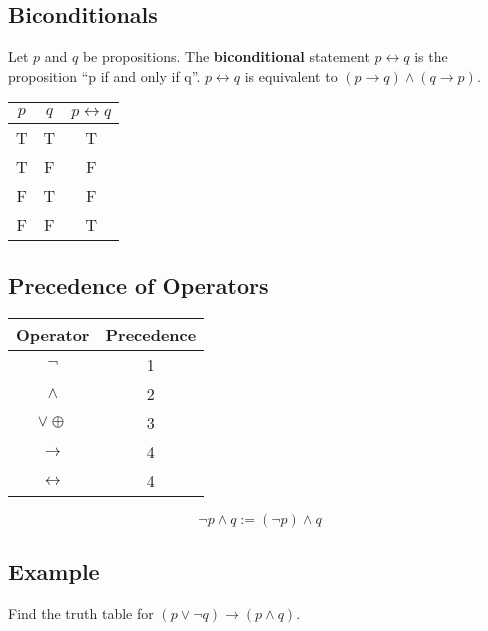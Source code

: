 \documentclass[letterpaper, 12pt]{math}
\begin{document}
\subsection*{Biconditionals}
Let \( p \) and \( q \) be propositions. The \textbf{biconditional} statement
\( p \leftrightarrow q \) is the proposition ``p if and only if q''.
\( p \leftrightarrow q \) is equivalent to \( (p \to q) \wedge (q \to p) \).
\begin{center}
  \begin{tabular}{|c|c|c|}
    \hline
    \( p \) & \( q \) & \( p \leftrightarrow q \) \\ \hline
    T & T & T \\ \hline
    T & F & F \\ \hline
    F & T & F \\ \hline
    F & F & T \\ \hline
  \end{tabular}
\end{center}

\subsection*{Precedence of Operators}
\begin{center}
  \begin{tabular}{|c|c|}
    \hline
    Operator              & Precedence \\ \hline
    \( \neg \)            & 1 \\ \hline
    \( \wedge \)          & 2 \\ \hline
    \( \vee \oplus \)     & 3 \\ \hline
    \( \to \)             & 4 \\ \hline
    \( \leftrightarrow \) & 4 \\ \hline
  \end{tabular}
\end{center}
\[ \neg{p} \wedge q := (\neg{p}) \wedge q \]

\subsection*{Example}
Find the truth table for \( (p \vee \neg{q}) \to (p \wedge q) \).
\end{document}
